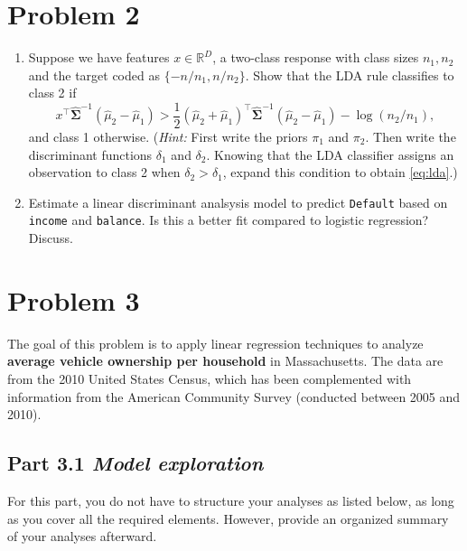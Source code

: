 \documentclass[11pt,twoside]{article}
\newcommand{\pts}[1]{\marginpar{ \small\hspace{0pt} \textit{[#1]} } }
\newcommand{\?}{\stackrel{?}{=}}
\newcommand{\fr}{\frac}
\begin{document}
\section*{Problem 2 }

\begin{enumerate}[\bf (a)]
\item Suppose we have features \pts{8} $x \in \mathbb{R}^D$, a two-class response with class sizes $n_1, n_2$ and the target coded as $\{-n/n_1, n/n_2\}$.
Show that the LDA rule classifies to class 2 if
\begin{equation}
 \label{eq:lda}
  x^\intercal \hat{\bm{\Sigma}}^{-1}(\hat\mu_2 - \hat\mu_1) > \fr12(\hat\mu_2 + \hat\mu_1)^\intercal\hat{\bm{\Sigma}}^{-1}(\hat\mu_2 - \hat\mu_1) - \log(n_2/n_1),
\end{equation}
and class 1 otherwise. (\textit{Hint:} First write the priors $\pi_{1}$ and $\pi_{2}$. Then write the discriminant functions $\delta_{1}$ and $\delta_{2}$. Knowing that the LDA classifier assigns an observation to class 2 when $\delta_{2} > \delta_{1}$, expand this condition to obtain \eqref{eq:lda}.)

\item Estimate a \pts{5} linear discriminant analsysis model to predict \texttt{Default} based on \texttt{income} and \texttt{balance}.
  Is this a better fit compared to logistic regression? Discuss.
  
\end{enumerate}



\section*{Problem 3 }
The goal of this problem  is to apply linear regression techniques  to analyze \textbf{average vehicle ownership per household} in Massachusetts.
The data are from the 2010 United States Census, which has been complemented with information from the American Community Survey (conducted between 2005 and 2010).


\subsection*{Part 3.1 {\it Model exploration}}
For this part, you do not have to structure your analyses as listed below, as long as you cover all the required
elements.  However, provide an organized summary of your analyses afterward.
  
\end{document}
